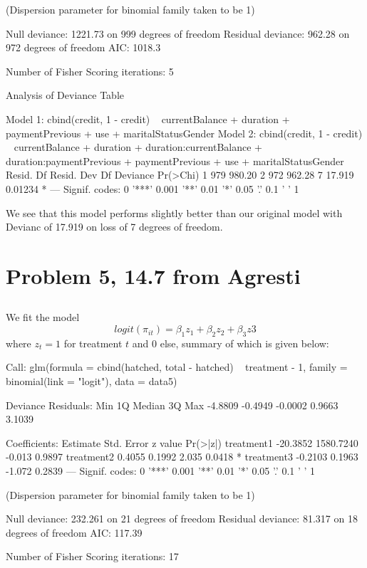 \documentclass{article}
\begin{document}
\begin{Schunk}
\begin{Soutput}
(Dispersion parameter for binomial family taken to be 1)

    Null deviance: 1221.73  on 999  degrees of freedom
Residual deviance:  962.28  on 972  degrees of freedom
AIC: 1018.3

Number of Fisher Scoring iterations: 5
\end{Soutput}
\begin{Soutput}
Analysis of Deviance Table

Model 1: cbind(credit, 1 - credit) ~ currentBalance + duration + paymentPrevious + 
    use + maritalStatusGender
Model 2: cbind(credit, 1 - credit) ~ currentBalance + duration + duration:currentBalance + 
    duration:paymentPrevious + paymentPrevious + use + maritalStatusGender
  Resid. Df Resid. Dev Df Deviance Pr(>Chi)  
1       979     980.20                       
2       972     962.28  7   17.919  0.01234 *
---
Signif. codes:  0 '***' 0.001 '**' 0.01 '*' 0.05 '.' 0.1 ' ' 1
\end{Soutput}
\end{Schunk}

We see that this model performs slightly better than our original model with Devianc of 17.919 on loss of 7 degrees of freedom.\\

\section{Problem 5, 14.7 from Agresti}


\subsection{}
We fit the model
$$logit(\pi_{it})=\beta_1z_1+\beta_2z_2+\beta_3z3$$
where $z_t=1$ for treatment $t$ and 0 else, summary of which is given below:
\begin{Schunk}
\begin{Soutput}
Call:
glm(formula = cbind(hatched, total - hatched) ~ treatment - 1, 
    family = binomial(link = "logit"), data = data5)

Deviance Residuals: 
    Min       1Q   Median       3Q      Max  
-4.8809  -0.4949  -0.0002   0.9663   3.1039  

Coefficients:
            Estimate Std. Error z value Pr(>|z|)  
treatment1  -20.3852  1580.7240  -0.013   0.9897  
treatment2    0.4055     0.1992   2.035   0.0418 *
treatment3   -0.2103     0.1963  -1.072   0.2839  
---
Signif. codes:  0 '***' 0.001 '**' 0.01 '*' 0.05 '.' 0.1 ' ' 1

(Dispersion parameter for binomial family taken to be 1)

    Null deviance: 232.261  on 21  degrees of freedom
Residual deviance:  81.317  on 18  degrees of freedom
AIC: 117.39

Number of Fisher Scoring iterations: 17
\end{Soutput}
\end{Schunk}
\end{document}
